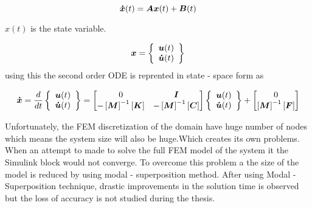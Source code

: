 \documentclass[main.tex]{subfiles}
\begin{document}
\begin{equation}\label{eq:SpaceState}
\boldsymbol{\dot{x}}(t)=\boldsymbol{A} \boldsymbol{x} (t)+\boldsymbol{B} (t)
\end{equation}

$x(t)$ is the state variable.

\begin{equation}
\boldsymbol{x} = 
\left\{
\begin{array}{r}
\boldsymbol{u}(t)
\\
\boldsymbol{\dot{u}}(t)
\end{array}
\right\}
\end{equation}
using this the second order ODE is reprented in state - space form as

\begin{equation}
\boldsymbol{\dot{x}} = \frac{d}{dt}
\left\{
 \begin{array}{r}  \boldsymbol{u}(t)  \\  \boldsymbol{\dot{u}}(t) \end{array}
\right\}
=
\begin{bmatrix}
0 & \boldsymbol{I} \\
-\left[\boldsymbol{M}\right] ^{-1} \left[\boldsymbol{K}\right]  &   -\left[\boldsymbol{M}\right] ^{-1} \left[\boldsymbol{C}\right]
\end{bmatrix}
\left\{
\begin{array}{r}
\boldsymbol{u}(t)
\\
\boldsymbol{\dot{u}}(t)
\end{array}
\right\}
+
\begin{bmatrix}
0 \\
\left[\boldsymbol{M}\right] ^{-1} \left[\boldsymbol{F}\right] 
\end{bmatrix}
\end{equation}

Unfortunately, the FEM discretization of the domain have huge number of nodes which means the system size will also be huge.Which creates its own problems. When an attempt to made to solve the full FEM model of the system it the Simulink block would not converge. To overcome this problem a the size of the model is reduced by using modal - superposition method. After using Modal - Superposition technique, drastic improvements in the solution time is observed but the loss of accuracy is not studied during the thesis.  
\end{document}
